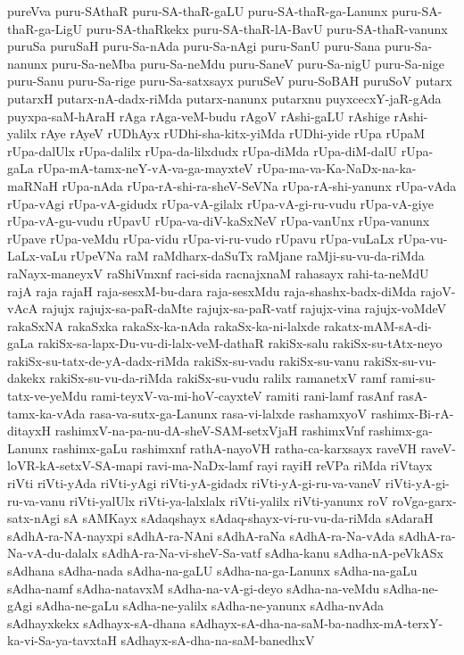 {pureVva
puru-SAthaR
puru-SA-thaR-gaLU
puru-SA-thaR-ga-Lanunx
puru-SA-thaR-ga-LigU
puru-SA-thaRkekx
puru-SA-thaR-lA-BavU
puru-SA-thaR-vanunx
puruSa
puruSaH
puru-Sa-nAda
puru-Sa-nAgi
puru-SanU
puru-Sana
puru-Sa-nanunx
puru-Sa-neMba
puru-Sa-neMdu
puru-SaneV
puru-Sa-nigU
puru-Sa-nige
puru-Sanu
puru-Sa-rige
puru-Sa-satxsayx
puruSeV
puru-SoBAH
puruSoV
putarx
putarxH
putarx-nA-dadx-riMda
putarx-nanunx
putarxnu
puyxcecxY-jaR-gAda
puyxpa-saM-hAraH
rAga
rAga-veM-budu
rAgoV
rAshi-gaLU
rAshige
rAshi-yalilx
rAye
rAyeV
rUDhAyx
rUDhi-sha-kitx-yiMda
rUDhi-yide
rUpa
rUpaM
rUpa-dalUlx
rUpa-dalilx
rUpa-da-lilxdudx
rUpa-diMda
rUpa-diM-dalU
rUpa-gaLa
rUpa-mA-tamx-neY-vA-va-ga-mayxteV
rUpa-ma-va-Ka-NaDx-na-ka-maRNaH
rUpa-nAda
rUpa-rA-shi-ra-sheV-SeVNa
rUpa-rA-shi-yanunx
rUpa-vAda
rUpa-vAgi
rUpa-vA-gidudx
rUpa-vA-gilalx
rUpa-vA-gi-ru-vudu
rUpa-vA-giye
rUpa-vA-gu-vudu
rUpavU
rUpa-va-diV-kaSxNeV
rUpa-vanUnx
rUpa-vanunx
rUpave
rUpa-veMdu
rUpa-vidu
rUpa-vi-ru-vudo
rUpavu
rUpa-vuLaLx
rUpa-vu-LaLx-vaLu
rUpeVNa
raM
raMdharx-daSuTx
raMjane
raMji-su-vu-da-riMda
raNayx-maneyxV
raShiVmxnf
raci-sida
racnajxnaM
rahasayx
rahi-ta-neMdU
rajA
raja
rajaH
raja-sesxM-bu-dara
raja-sesxMdu
raja-shashx-badx-diMda
rajoV-vAcA
rajujx
rajujx-sa-paR-daMte
rajujx-sa-paR-vatf
rajujx-vina
rajujx-voMdeV
rakaSxNA
rakaSxka
rakaSx-ka-nAda
rakaSx-ka-ni-lalxde
rakatx-mAM-sA-di-gaLa
rakiSx-sa-lapx-Du-vu-di-lalx-veM-dathaR
rakiSx-salu
rakiSx-su-tAtx-neyo
rakiSx-su-tatx-de-yA-dadx-riMda
rakiSx-su-vadu
rakiSx-su-vanu
rakiSx-su-vu-dakekx
rakiSx-su-vu-da-riMda
rakiSx-su-vudu
ralilx
ramanetxV
ramf
rami-su-tatx-ve-yeMdu
rami-teyxV-va-mi-hoV-cayxteV
ramiti
rani-lamf
rasAnf
rasA-tamx-ka-vAda
rasa-va-sutx-ga-Lanunx
rasa-vi-lalxde
rashamxyoV
rashimx-Bi-rA-ditayxH
rashimxV-na-pa-nu-dA-sheV-SAM-setxVjaH
rashimxVnf
rashimx-ga-Lanunx
rashimx-gaLu
rashimxnf
rathA-nayoVH
ratha-ca-karxsayx
raveVH
raveV-loVR-kA-setxV-SA-mapi
ravi-ma-NaDx-lamf
rayi
rayiH
reVPa
riMda
riVtayx
riVti
riVti-yAda
riVti-yAgi
riVti-yA-gidadx
riVti-yA-gi-ru-va-vaneV
riVti-yA-gi-ru-va-vanu
riVti-yalUlx
riVti-ya-lalxlalx
riVti-yalilx
riVti-yanunx
roV
roVga-garx-satx-nAgi
sA
sAMKayx
sAdaqshayx
sAdaq-shayx-vi-ru-vu-da-riMda
sAdaraH
sAdhA-ra-NA-nayxpi
sAdhA-ra-NAni
sAdhA-raNa
sAdhA-ra-Na-vAda
sAdhA-ra-Na-vA-du-dalalx
sAdhA-ra-Na-vi-sheV-Sa-vatf
sAdha-kanu
sAdha-nA-peVkASx
sAdhana
sAdha-nada
sAdha-na-gaLU
sAdha-na-ga-Lanunx
sAdha-na-gaLu
sAdha-namf
sAdha-natavxM
sAdha-na-vA-gi-deyo
sAdha-na-veMdu
sAdha-ne-gAgi
sAdha-ne-gaLu
sAdha-ne-yalilx
sAdha-ne-yanunx
sAdha-nvAda
sAdhayxkekx
sAdhayx-sA-dhana
sAdhayx-sA-dha-na-saM-ba-nadhx-mA-terxY-ka-vi-Sa-ya-tavxtaH
sAdhayx-sA-dha-na-saM-banedhxV
}
